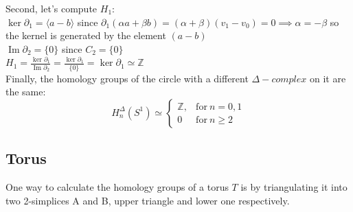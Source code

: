 \documentclass[11pt,a4paper]{report}
\DeclareMathOperator{\Ima}{Im}
\begin{document}
\par
Second, let's compute $H_1$: \\
$\ker\partial_1 = \langle a-b \rangle$
		since $\partial_1(\alpha a + \beta b) = (\alpha + \beta)(v_1 - v_0) = 0 \implies \alpha = -\beta$ so the kernel is generated by the element $(a - b)$ \\
$\Ima\partial_2 = \{0\}$ since $C_2 = \{0\}$ \\
$H_1 = \frac{\ker\partial_1}{\Ima\partial_2} =
		\frac{ \ker{\partial_1} }{ \{0\} } = \ker{\partial_1} \simeq \mathbb{Z}$ \\


Finally, the homology groups of the circle with a different $\Delta- complex$ on it are the same:
		\[
	  		H_n^\Delta(S^1) \simeq \left\{
			      \begin{array}{rl}
			     \mathbb{Z}, & \textrm{for} \: n = 0, 1\\

                        0 & \textrm{for} \: n \geqslant 2
			      \end{array}
			 \right.
	  	\]



		      \subsection{Torus}

One way to calculate the homology groups of a torus $T$ is by triangulating it into two 2-simplices A and B, upper triangle and lower one respectively.
                
\end{document}
